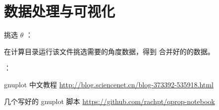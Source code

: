 \section{数据处理与可视化}

挑选 $\theta$ ：


在计算目录运行该文件挑选需要的角度数据，得到 合并好的的数据。


：


gnuplot 中文教程 \url{http://blog.sciencenet.cn/blog-373392-535918.html}

几个写好的 gnuplot 脚本 \url{https://github.com/rachpt/qprop-notebook}
